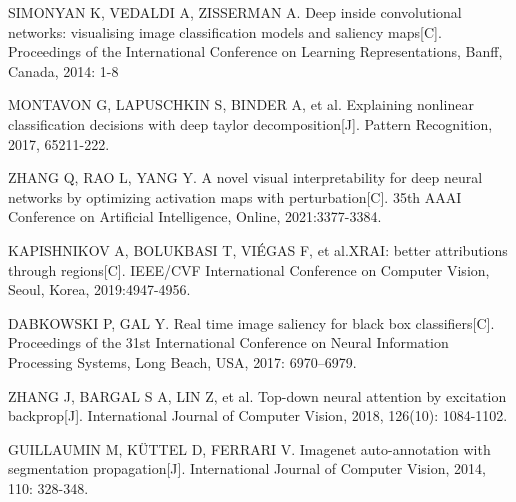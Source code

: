 \begin{thebibliography}{200}
SIMONYAN K, VEDALDI A, ZISSERMAN A. Deep inside convolutional networks: visualising image classification models and saliency maps[C]. Proceedings of the International Conference on Learning Representations, Banff, Canada, 2014: 1-8


MONTAVON G, LAPUSCHKIN S, BINDER A, et al. Explaining nonlinear classification decisions with deep taylor decomposition[J]. Pattern Recognition, 2017, 65211-222.


ZHANG Q, RAO L, YANG Y. A novel visual interpretability for deep neural networks by optimizing activation maps with perturbation[C]. 35th AAAI Conference on Artificial Intelligence, Online, 2021:3377-3384.

KAPISHNIKOV A, BOLUKBASI T, VIÉGAS F, et al.XRAI: better attributions through regions[C]. IEEE/CVF International Conference on Computer Vision, Seoul, Korea, 2019:4947-4956.

DABKOWSKI P, GAL Y. Real time image saliency for black box classifiers[C]. Proceedings of the 31st International Conference on Neural Information Processing Systems, Long Beach, USA, 2017: 6970–6979.

ZHANG J, BARGAL S A, LIN Z, et al. Top-down neural attention by excitation backprop[J]. International Journal of Computer Vision, 2018, 126(10): 1084-1102.

GUILLAUMIN M, KÜTTEL D, FERRARI V. Imagenet auto-annotation with segmentation propagation[J]. International Journal of Computer Vision, 2014, 110: 328-348.



\end{thebibliography}

%



%





\clearpage